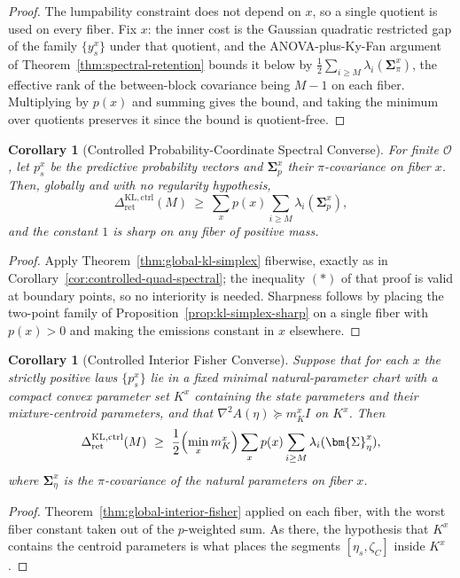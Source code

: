\documentclass[12pt]{article}
\newtheorem{corollary}[theorem]{Corollary}
\theoremstyle{definition}
\newcommand{\RetKLc}{\Delta_{\mathrm{ret}}^{\mathrm{KL,ctrl}}}
\begin{document}
\begin{proof}
The lumpability constraint does not depend on $x$, so a single quotient is used
on every fiber.  Fix $x$: the inner cost is the Gaussian quadratic restricted
gap of the family $\{y_s^x\}$ under that quotient, and the ANOVA-plus-Ky-Fan
argument of Theorem~\ref{thm:spectral-retention} bounds it below by
$\tfrac12\sum_{i\ge M}\lambda_i(\bm{\Sigma}_\pi^x)$, the effective rank of the
between-block covariance being $M-1$ on each fiber.  Multiplying by $p(x)$ and
summing gives the bound, and taking the minimum over quotients preserves it
since the bound is quotient-free.
\end{proof}

\begin{corollary}[Controlled Probability-Coordinate Spectral Converse]
\label{cor:controlled-simplex-spectral}
For finite $\mathcal O$, let $p_s^x$ be the predictive probability vectors and
$\bm{\Sigma}_p^x$ their $\pi$-covariance on fiber $x$.  Then, globally and with no
regularity hypothesis,
\[
\RetKLc(M)
\ \ge\
\sum_xp(x)\sum_{i\ge M}\lambda_i(\bm{\Sigma}_p^x),
\]
and the constant $1$ is sharp on any fiber of positive mass.
\end{corollary}

\begin{proof}
Apply Theorem~\ref{thm:global-kl-simplex} fiberwise, exactly as in
Corollary~\ref{cor:controlled-quad-spectral}; the inequality $(*)$ of that
proof is valid at boundary points, so no interiority is needed.  Sharpness
follows by placing the two-point family of
Proposition~\ref{prop:kl-simplex-sharp} on a single fiber with $p(x)>0$ and
making the emissions constant in $x$ elsewhere.
\end{proof}

\begin{corollary}[Controlled Interior Fisher Converse]
\label{cor:controlled-fisher}
Suppose that for each $x$ the strictly positive laws $\{p_s^x\}$ lie in a fixed
minimal natural-parameter chart with a compact convex parameter set $K^x$
containing the state parameters \emph{and} their mixture-centroid parameters,
and that $\nabla^2A(\eta)\succeq m_{K}^{x}I$ on $K^x$.  Then
\[
\RetKLc(M)
\ \ge\
\frac12\Bigl(\min_xm_{K}^{x}\Bigr)\sum_xp(x)\sum_{i\ge M}\lambda_i(\bm{\Sigma}_\eta^x),
\]
where $\bm{\Sigma}_\eta^x$ is the $\pi$-covariance of the natural parameters on
fiber $x$.
\end{corollary}

\begin{proof}
Theorem~\ref{thm:global-interior-fisher} applied on each fiber, with the worst
fiber constant taken out of the $p$-weighted sum.  As there, the hypothesis
that $K^x$ contains the centroid parameters is what places the segments
$[\eta_s,\zeta_C]$ inside $K^x$.
\end{proof}
\end{document}
